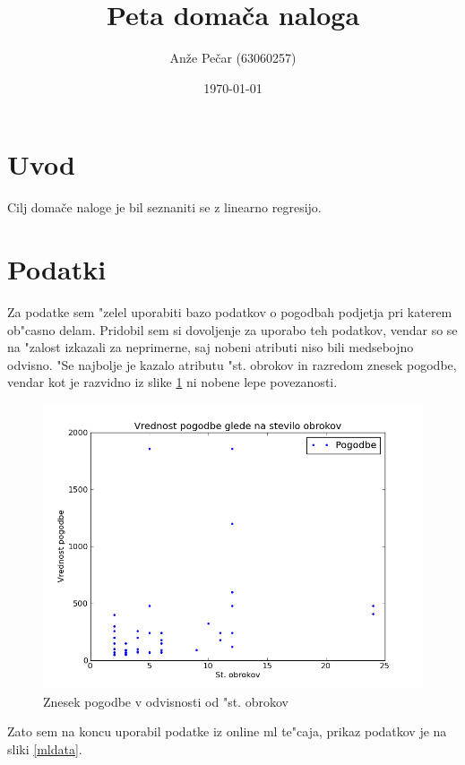 \documentclass[a4paper,11pt]{article}
\title{Peta domača naloga}
\author{Anže Pečar (63060257)}
\date{\today}
\begin{document}
\maketitle

\section{Uvod}

Cilj domače naloge je bil seznaniti se z linearno regresijo.
\section{Podatki}

Za podatke sem "zelel uporabiti bazo podatkov o pogodbah podjetja pri katerem ob"casno delam. Pridobil sem si dovoljenje za uporabo teh podatkov, vendar so se na "zalost izkazali za neprimerne, saj nobeni atributi niso bili medsebojno odvisno. "Se najbolje je kazalo atributu "st. obrokov in razredom znesek pogodbe, vendar kot je razvidno iz slike \ref{pogodbe} ni nobene lepe povezanosti.

\begin{figure}[H]
\begin{center}
\includegraphics[scale=0.3]{pogodbe.png}
\caption{Znesek pogodbe v odvisnosti od "st. obrokov}

\end{center}
\label{pogodbe}
\end{figure}

Zato sem na koncu uporabil podatke iz online ml te"caja, prikaz podatkov je na sliki \ref{mldata}.
\end{document}
